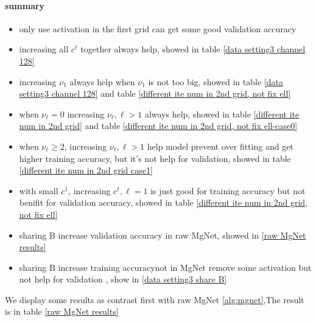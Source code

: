 \paragraph{summary}
\begin{itemize}
	\item only use activation in the first grid can get some good validation accuracy
	\item increasing all $c^\ell$ together always help, showed in table \ref{data setting3  channel 128}
	\item increasing $\nu_1$ always help when $\nu_1$ is not too big, showed in table \ref{data setting3  channel 128} and table \ref{different ite num in 2nd grid, not fix ell}
	\item when $\nu_\ell=0$ increasing $\nu_\ell, \ell>1$  always help, showed in table \ref{different ite num in 2nd grid} and table \ref{different ite num in 2nd grid, not fix ell-case0}
	
	\item when $\nu_\ell \geq 2$, increasing $\nu_\ell, \ell>1$ help model prevent over fitting and get higher training accuracy, but it's not help for validation, showed in table \ref{different ite num in 2nd grid case1}
	\item with small $c^1$, increasing $c^\ell, \ell=1$ is just good for training accuracy but not benifit for validation accuracy, showed in table \ref{different ite num in 2nd grid, not fix ell}
	\item sharing B increase validation accuracy in raw MgNet, showed in \ref{raw MgNet results}
	\item sharing B increase training accuracynot in MgNet remove some activation but not help for validation , show in \ref{data setting3  share B} 

\end{itemize}

We display some results as contrast first with raw MgNet \ref{alg:mgnet},The result is in table \ref{raw MgNet results}

